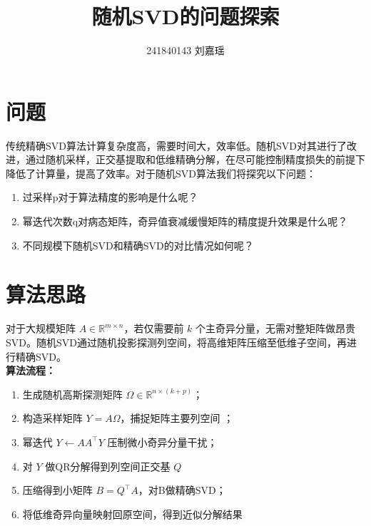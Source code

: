 \documentclass{article}
\title{随机SVD的问题探索}
\author{241840143 刘嘉瑶}
\begin{document}
\maketitle%

\section{问题}
\noindent%
传统精确SVD算法计算复杂度高，需要时间大，效率低。随机SVD对其进行了改进，通过随机采样，正交基提取和低维精确分解，在尽可能控制精度损失的前提下降低了计算量，提高了效率。对于随机SVD算法我们将探究以下问题：

\begin{enumerate}
	
	\item 
	过采样p对于算法精度的影响是什么呢？
	
	\item
	幂迭代次数q对病态矩阵，奇异值衰减缓慢矩阵的精度提升效果是什么呢？
	
	\item
	不同规模下随机SVD和精确SVD的对比情况如何呢？
\end{enumerate}



\section{算法思路}
\noindent 
对于大规模矩阵 \(A\in \mathbb R^{m\times n}\)，若仅需要前 \(k\) 个主奇异分量，无需对整矩阵做昂贵SVD。随机SVD通过随机投影探测列空间，将高维矩阵压缩至低维子空间，再进行精确SVD。\\

\noindent
\textbf{算法流程：}
\begin{enumerate}
	\item 生成随机高斯探测矩阵 \(\Omega\in\mathbb R^{n\times (k+p)}\)；
	
	\item 构造采样矩阵 \(Y=A\Omega\)，捕捉矩阵主要列空间
	；
	\item  幂迭代 \(Y\leftarrow AA^\top Y\) 压制微小奇异分量干扰；
	
	\item 对 \(Y\) 做QR分解得到列空间正交基 \(Q\)
	
	\item 压缩得到小矩阵 \(B=Q^\top A\)，对B做精确SVD；
	
	\item 将低维奇异向量映射回原空间，得到近似分解结果

\end{enumerate}
\end{document}
